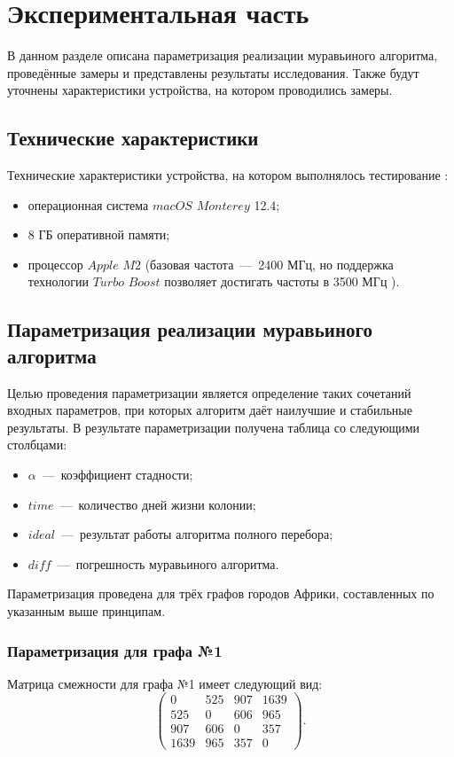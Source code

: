 \chapter{Экспериментальная часть}

В данном разделе описана параметризация реализации муравьиного алгоритма,  проведённые замеры и представлены результаты исследования. Также будут уточнены характеристики устройства, на котором проводились замеры.

\section{Технические характеристики}
Технические характеристики устройства, на котором выполнялось тестирование \cite{item4}:
\begin{itemize}
	\item операционная система $macOS$ $Monterey$ 12.4;
	\item 8 ГБ оперативной памяти;
	\item процессор $Apple$ $M2$ (базовая частота~---~2400 МГц, но поддержка технологии $Turbo$ $Boost$ позволяет достигать частоты в 3500 МГц \cite{item5}).
\end{itemize}

\section{Параметризация реализации муравьиного алгоритма}
Целью проведения параметризации является определение таких сочетаний входных параметров, при которых алгоритм даёт наилучшие и стабильные результаты.
В результате параметризации получена таблица со следующими столбцами:
\begin{itemize}
	\item $\alpha$~---~коэффициент стадности;
	\item $time$~---~количество дней жизни колонии;
	\item $ideal$~---~результат работы алгоритма полного перебора;
	\item $diff$~---~погрешность муравьиного алгоритма.
\end{itemize}

Параметризация проведена для трёх графов городов Африки, составленных по указанным выше принципам.

\subsection{Параметризация для графа №1}
Матрица смежности для графа №1 имеет следующий вид:
\begin{equation}
	\begin{pmatrix}
		0 & 525 & 907 & 1639\\
		525 & 0 & 606 & 965\\
		907 & 606 & 0 & 357\\
		1639 & 965 & 357 & 0
	\end{pmatrix}.
\end{equation}

